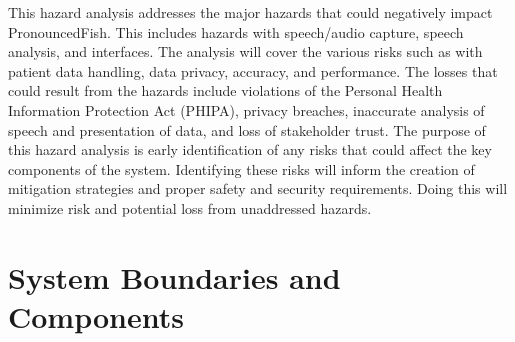 \documentclass{article}
\begin{document}
This hazard analysis addresses the major hazards that could negatively impact PronouncedFish. This includes hazards with 
speech/audio capture, speech analysis, and interfaces. The analysis will cover the various risks such as with patient data handling, 
data privacy, accuracy, and performance. The losses that could result from the hazards include violations of the Personal Health Information Protection Act (PHIPA), privacy breaches, inaccurate analysis of speech and presentation of data, and loss of stakeholder trust.
The purpose of this hazard analysis is early identification of any risks that could affect the key components of the system. 
Identifying these risks will inform the creation of mitigation strategies and proper safety and security requirements. 
Doing this will minimize risk and potential loss from unaddressed hazards. 

\clearpage
\section{System Boundaries and Components}
\end{document}
